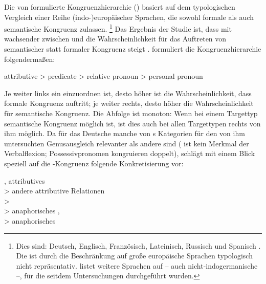 Die von \citet{corbett1979} formulierte Kongruenzhierarchie () basiert auf dem typologischen Vergleich einer Reihe
(indo-)europäischer Sprachen, die sowohl formale als auch
semantische Kongruenz zulassen.%
%
	\footnote{Dies sind: 
		Deutsch, %
		Englisch, %
		Französisch, %
		Lateinisch, %
		Russisch und %
		Spanisch %
	\autocite[214--215]{corbett1979}. Die  ist durch die
	Beschränkung auf große europäische Sprachen typologisch
	nicht repräsentativ. \citet[218]{corbett2006} listet weitere Sprachen auf
	-- auch nicht-indogermanische --, für die seitdem Untersuchungen
	durchgeführt wurden.}
%
Das Ergebnis der Studie ist, dass mit wachsender  zwischen  und 
die Wahrscheinlichkeit für das Auftreten von semantischer statt formaler
Kongruenz steigt \autocite[218--223]{corbett1979}. \citet[204]{corbett1979}
formuliert die Kongruenzhierarchie folgendermaßen:

\begin{exe}
\ex attributive > predicate > relative pronoun > personal pronoun
\end{exe}

Je weiter links ein  einzuordnen ist, desto höher ist die
Wahrscheinlichkeit, dass formale Kongruenz auftritt; je
weiter rechts, desto höher die Wahrscheinlichkeit für semantische
Kongruenz. Die Abfolge ist monoton: Wenn
bei einem Targettyp semantische Kongruenz möglich ist, ist dies auch bei allen
Targettypen rechts von ihm möglich. Da für das Deutsche
manche von \citeauthor{corbett1979}s Kategorien für den von ihm untersuchten
Genusausgleich relevanter als andere sind ( ist kein Merkmal der
Verbalflexion; Possessivpronomen kongruieren doppelt), schlägt
\citet[193]{fleischer2012} mit einem Blick speziell auf die
-Kongruenz folgende Konkretisierung vor:

\begin{exe}
\ex {}, attributives  \\
	\hspace*{1em} > andere attributive Relationen \\
	\hspace*{2em} >  \\
	\hspace*{3em} > anaphorisches ,
		 \\
	\hspace*{4em} > anaphorisches 
\end{exe}

